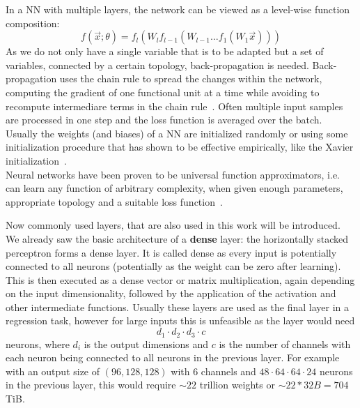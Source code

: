 In a NN with multiple layers, the network can be viewed as a level-wise function composition:
\[ f(\overrightarrow{x}; \theta) = f_l (W_l f_{l-1}(W_{l-1} \dots f_1(W_1 \overrightarrow{x}))) \]
As we do not only have a single variable that is to be adapted but a set of variables, connected by a certain topology, back-propagation is needed.
Back-propagation uses the chain rule to spread the changes within the network, computing the gradient of one functional unit at a time while avoiding to recompute intermediare terms in the chain rule~\autocite{van_der_malsburg_frank_1986}.
Often multiple input samples are processed in one step and the loss function is averaged over the batch.
Usually the weights (and biases) of a NN are initialized randomly or using some initialization procedure that has shown to be effective empirically, like the Xavier initialization~\autocite{glorot_understanding_2010}. \\

Neural networks have been proven to be universal function approximators, i.e. can learn any function of arbitrary complexity, when given enough parameters, appropriate topology and a suitable loss function~\autocite{sonoda_neural_2017}. \\


Now commonly used layers, that are also used in this work will be introduced.
We already saw the basic architecture of a \textbf{dense} layer: the horizontally stacked perceptron forms a dense layer.
It is called dense as every input is potentially connected to all neurons (potentially as the weight can be zero after learning).
This is then executed as a dense vector or matrix multiplication, again depending on the input dimensionality, followed by the application of the activation and other intermediate functions.
Usually these layers are used as the final layer in a regression task, however for large inputs this is unfeasible as the layer would need
\[ d_1 \cdot d_2 \cdot d_3  \cdot c \]
neurons, where $d_i$ is the output dimensions and $c$ is the number of channels with each neuron being connected to all neurons in the previous layer.
For example with an output size of $(96, 128, 128)$ with $6$ channels and $48 \cdot 64 \cdot 64 \cdot 24$ neurons in the previous layer, this would require $\sim22$ trillion weights or $\sim22 * 32B = 704$ TiB.

